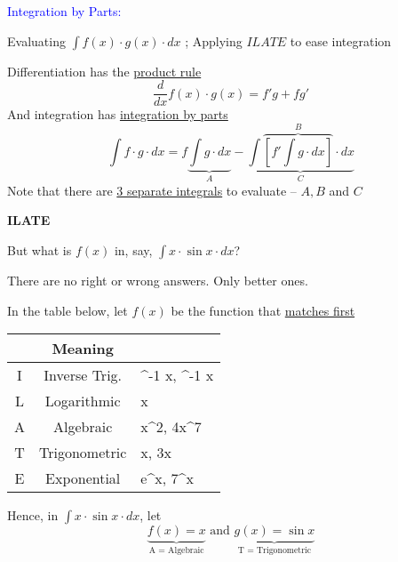 \documentclass[14pt,fleqn]{extarticle}
\begin{document}
\textcolor{blue}{Integration by Parts:} 

Evaluating $\int f(x)\cdot g(x)\cdot dx$ ; Applying $ILATE$ to ease integration

\newcard 

Differentiation has the \underline{product rule}
\[ \frac{d}{dx} f(x)\cdot g(x) = f'g + fg ' \]
And integration has \underline{integration by parts}
\[ \int f\cdot g\cdot dx = f\underbrace{\int g\cdot dx}_A - \underbrace{\int \overbrace{\left[f'\int g\cdot dx \right]}^B\cdot dx}_{C}\]
Note that there are \underline{3 separate integrals} to evaluate -- $A,B$ and $C$\newline 

\textbf{ILATE}

But what is $f(x)$ in, say, $\int x\cdot\sin x\cdot dx$?  

There are no right or wrong answers. Only better ones.\newline 

In the table below, let \underline{$f(x)$} be the function that \underline{matches first}

\begin{tabular}{CCM}
\midrule
	 & Meaning & \\
\midrule
	I & Inverse Trig. & \sin^{-1} x, \tan^{-1} x \\
\midrule
	L & Logarithmic & \log x\\
\midrule
	A & Algebraic & x^2, 4x^7 \\
\midrule
	T & Trigonometric & \sin x, \cos 3x \\
\midrule
	E & Exponential & e^x, 7^x\\
\midrule
\end{tabular}\newline 

Hence, in $\int x\cdot\sin x\cdot dx$, let 
\[ \underbrace{f(x) = x}_{\text{A = Algebraic}}\text{ and } \underbrace{g(x) = \sin x}_{\text{T = Trigonometric}} \]
\end{document}
